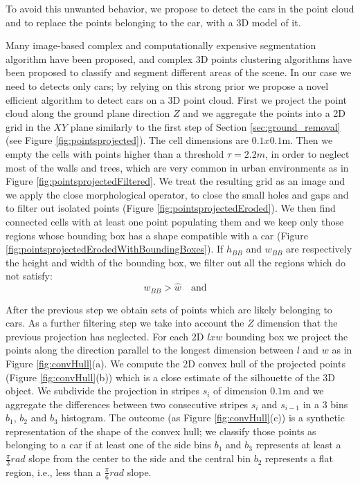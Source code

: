 To avoid this unwanted behavior, we propose to detect the cars in the point cloud and to replace the points belonging to the car, with a 3D model of it.

Many image-based complex and computationally expensive segmentation algorithm have been proposed, and complex 3D points clustering algorithms have been proposed to  classify and segment different areas of the scene. 
In our case we  need to detects only cars; by relying on this strong prior we propose a novel efficient algorithm to detect cars on a 3D point cloud.
First we project the point cloud along the  ground plane direction $Z$ and we aggregate the points into a 2D grid in the $XY$ plane similarly to the first step of Section \ref{sec:ground_removal} (see Figure \ref{fig:pointsprojected}). 
The cell dimensions are $0.1x0.1$m.
Then we empty the cells  with points higher than a threshold $\tau=2.2m$, in order to neglect most of the walls and trees, which are very common in urban environments as in Figure \ref{fig:pointsprojectedFiltered}.
We treat the resulting grid as an image and we apply the close morphological operator, to close the small holes and gaps and to filter out isolated points (Figure \ref{fig:pointsprojectedEroded}).
We then find connected cells with at least one point populating them and we keep only those regions whose bounding box has a shape compatible with a car (Figure \ref{fig:pointsprojectedErodedWithBoundingBoxes}). 
If $h_{BB}$ and $w_{BB}$ are respectively the height and width of the bounding box, we filter out all the regions which do not satisfy:
\begin{equation}
 w_{BB} > \hat{w} \quad \text{and} \quad 
\end{equation}

After the previous step we obtain sets of points which are likely belonging to cars. 
As a further filtering step we take into account the $Z$ dimension that the previous projection has neglected.
For each 2D $lxw$ bounding box we project the points along the direction parallel to the longest dimension between $l$ and $w$ as in Figure \ref{fig:convHull}(a).
We compute the 2D convex hull of the projected points (Figure \ref{fig:convHull}(b)) which is a close estimate of the silhouette of the 3D object. 
We subdivide the projection in  stripes $s_i$ of dimension $0.1$m and we aggregate the differences between two consecutive stripes $s_i$ and $s_{i-1}$ in a 3 bins $b_1$, $b_2$ and $b_3$ histogram.
The outcome (as Figure \ref{fig:convHull}(c)) is a synthetic representation of the shape of the convex hull; we classify those points as belonging to a car if at least one of the side bins $b_1$ and $b_3$ represents at least a $\frac{\pi}{3}rad$ slope from the center to the side and the central bin $b_2$ represents a flat region, i.e., less than a $\frac{\pi}{6}rad$ slope.

